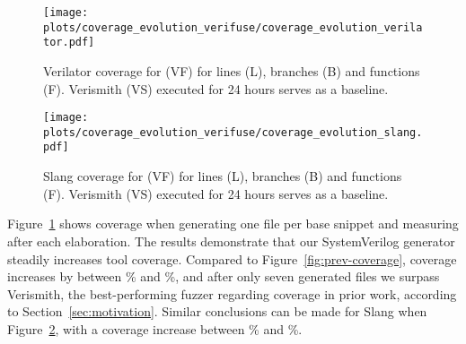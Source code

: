 \begin{figure}[t]
    \centering
    \texttt{[image: plots/coverage\_evolution\_verifuse/coverage\_evolution\_verilator.pdf]}
    \caption{Verilator coverage for \ourname (VF) for lines (L), branches (B) and functions (F). Verismith (VS) executed for 24 hours serves as a baseline.}
    \label{fig:verilatorcoverage}
\end{figure}



\begin{figure}[t]
    \centering
    \texttt{[image: plots/coverage\_evolution\_verifuse/coverage\_evolution\_slang.pdf]}
    \caption{Slang coverage for \ourname (VF) for lines (L), branches (B) and functions (F). Verismith (VS) executed for 24 hours serves as a baseline.}
    \label{fig:slangcoverage}
\end{figure}


Figure~\ref{fig:verilatorcoverage} shows coverage when generating one file per base snippet and measuring after each elaboration.
The results demonstrate that our SystemVerilog generator steadily increases tool coverage.
Compared to Figure~\ref{fig:prev-coverage}, coverage increases by between \covboostlowverilator\% and \covboosthighverilator\%, and after only seven generated files we surpass Verismith, the best-performing fuzzer regarding coverage in prior work, according to Section~\ref{sec:motivation}.
Similar conclusions can be made for Slang when Figure~\ref{fig:slangcoverage}, with a coverage increase between \covboostlowslang\% and \covboosthighslang\%.




